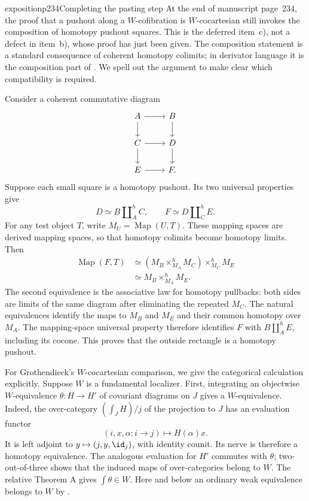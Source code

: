 \begin{dcomment}{exposition}{p234}{Completing the pasting step}
At the end of manuscript page~234, the proof that a pushout along a $W$-cofibration is $W$-cocartesian still invokes the composition of homotopy pushout squares. This is the deferred item~c), not a defect in item~b), whose proof has just been given. The composition statement is a standard consequence of coherent homotopy colimits; in derivator language it is the composition part of \citet[Proposition 3.13, published version]{Groth2013}. We spell out the argument to make clear which compatibility is required.

Consider a coherent commutative diagram
\[
\begin{tikzcd}
 A\arrow[r]\arrow[d]&B\arrow[d]\\
 C\arrow[r]\arrow[d]&D\arrow[d]\\
 E\arrow[r]&F .
\end{tikzcd}
\]
Suppose each small square is a homotopy pushout. Its two universal properties give
\[
 D\simeq B\amalg_A^{h}C,\qquad
 F\simeq D\amalg_C^{h}E.
\]
For any test object $T$, write $M_U=\operatorname{Map}(U,T)$. These mapping spaces are derived mapping spaces, so that homotopy colimits become homotopy limits. Then
\[
\begin{aligned}
 \operatorname{Map}(F,T)
 &\simeq (M_B\times^h_{M_A}M_C)\times^h_{M_C}M_E\\
 &\simeq M_B\times^h_{M_A}M_E.
\end{aligned}
\]
The second equivalence is the associative law for homotopy pullbacks: both sides are limits of the same diagram after eliminating the repeated $M_C$. The natural equivalences identify the maps to $M_B$ and $M_E$ and their common homotopy over $M_A$. The mapping-space universal property therefore identifies $F$ with $B\amalg_A^h E$, including its cocone. This proves that the outside rectangle is a homotopy pushout.

For Grothendieck's $W$-cocartesian comparison, we give the categorical calculation explicitly. Suppose $W$ is a fundamental localizer. First, integrating an objectwise $W$-equivalence $\theta:H\to H'$ of covariant diagrams on $J$ gives a $W$-equivalence. Indeed, the over-category $(\int_J H)/j$ of the projection to $J$ has an evaluation functor
\[
 (i,x,\alpha:i\to j)\longmapsto H(\alpha)x.
\]
It is left adjoint to $y\mapsto(j,y,\id_j)$, with identity counit. Its nerve is therefore a homotopy equivalence. The analogous evaluation for $H'$ commutes with $\theta$; two-out-of-three shows that the induced maps of over-categories belong to $W$. The relative Theorem A gives $\int\theta\in W$. Here and below an ordinary weak equivalence belongs to $W$ by \citet[Theorem 2.2.11]{Cisinski2004Minimal}.


\end{dcomment}
